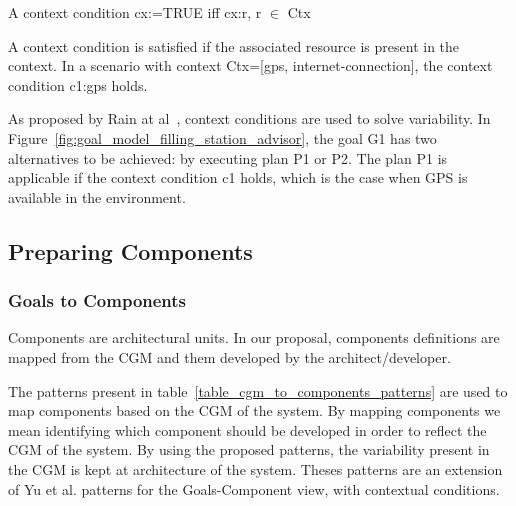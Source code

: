 \begin{defn}
  A context condition cx:=TRUE iff cx:r, r $\in$ Ctx
\end{defn}

A context condition is satisfied if the associated resource is present in the context.
In a scenario with context Ctx=[gps, internet-connection], the context condition c1:gps holds.

As proposed by Rain at al~\cite{ali_goal-based_2010}, context conditions are used to solve variability. In Figure~\ref{fig:goal_model_filling_station_advisor}, the goal G1 has two alternatives to be achieved: by executing plan P1 or P2. The plan P1 is applicable if the context condition c1 holds, which is the case when GPS is available in the environment.


\subsection{Preparing Components}

\subsubsection{Goals to Components}
\label{sec:goals_components}
Components are architectural units. In our proposal, components definitions are mapped from the CGM and them developed by the architect/developer.

The patterns present in table~\ref{table_cgm_to_components_patterns} are used to map components based on the CGM of the system. By mapping components we mean identifying which component should be developed in order to reflect the CGM of the system. By using the proposed patterns, the variability present in the CGM is kept at architecture of the system. Theses patterns are an extension of Yu et al.\cite{yu_goals_2008} patterns for the Goals-Component view, with contextual conditions.

